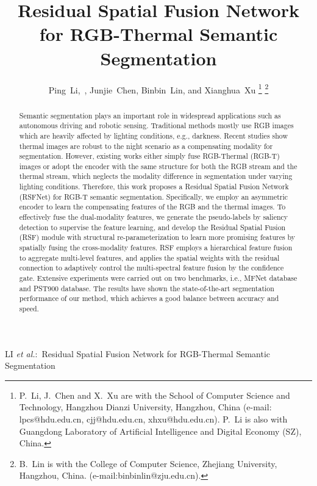 \documentclass[10.5pt,twocolumn,journal,letterpaper]{IEEEtran}
\newcommand{\eg}{e.g.}
\newcommand{\ie}{i.e.}
\begin{document}
\title{Residual Spatial Fusion Network for RGB-Thermal Semantic Segmentation}


\author{Ping~Li,~, Junjie~Chen, Binbin~Lin, and Xianghua~Xu 
\thanks{P.~Li, J.~Chen and X.~Xu are with the School of Computer Science and Technology, Hangzhou Dianzi University, Hangzhou, China (e-mail: lpcs@hdu.edu.cn, cjj@hdu.edu.cn, xhxu@hdu.edu.cn). P.~Li is also with Guangdong Laboratory of Artificial Intelligence and Digital Economy (SZ), China.}
\thanks{B.~Lin is with the College of Computer Science, Zhejiang University, Hangzhou, China. (e-mail:binbinlin@zju.edu.cn).} 
}
{LI \MakeLowercase{\textit{et al.}}:~Residual Spatial Fusion Network for RGB-Thermal Semantic Segmentation}



\maketitle

\begin{abstract}
  Semantic segmentation plays an important role in widespread applications such as autonomous driving and robotic sensing. Traditional methods mostly use RGB images which are heavily affected by lighting conditions, \eg, darkness. Recent studies show thermal images are robust to the night scenario as a compensating modality for segmentation. However, existing works either simply fuse RGB-Thermal (RGB-T) images or adopt the encoder with the same structure for both the RGB stream and the thermal stream, which neglects the modality difference in segmentation under varying lighting conditions. Therefore, this work proposes a Residual Spatial Fusion Network (RSFNet) for RGB-T semantic segmentation. Specifically, we employ an asymmetric encoder to learn the compensating features of the RGB and the thermal images. To effectively fuse the dual-modality features, we generate the pseudo-labels by saliency detection to supervise the feature learning, and develop the Residual Spatial Fusion (RSF) module with structural re-parameterization to learn more promising features by spatially fusing the cross-modality features. RSF employs a hierarchical feature fusion to aggregate multi-level features, and applies the spatial weights with the residual connection to adaptively control the multi-spectral feature fusion by the confidence gate. Extensive experiments were carried out on two benchmarks, \ie, MFNet database and PST900 database. The results have shown the state-of-the-art segmentation performance of our method, which achieves a good balance between accuracy and speed. 
 
\end{abstract}
\end{document}

